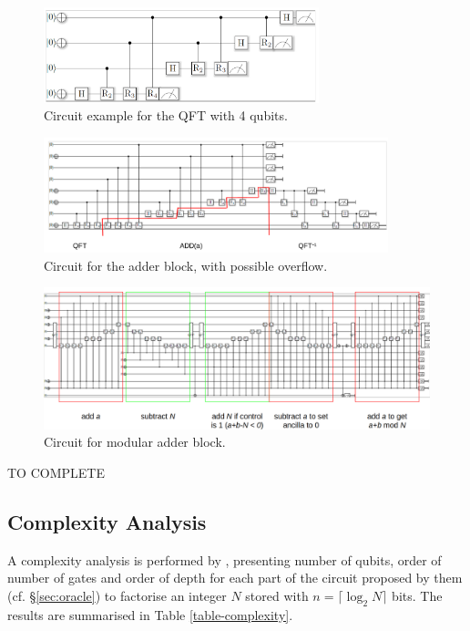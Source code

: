 \documentclass[a4paper, 10pt]{article}
\numberwithin{equation}{section}
\numberwithin{figure}{section}
\numberwithin{table}{section}
\begin{document}
\begin{figure}[h!]
	\centering
	\includegraphics[width=8cm]{Figures/generated-qft}
	\caption{Circuit example for the QFT with 4 qubits.}
	\label{fig:gen1}
\end{figure}

\begin{figure}[h!]
	\centering
	\includegraphics[width=10cm]{Figures/generated-adder}
	\caption{Circuit for the adder block, with possible overflow.}
	\label{fig:gen2}
\end{figure}

\begin{figure}[h!]
	\centering
	\includegraphics[width=12cm]{Figures/generated-modadder}
	\caption{Circuit for modular adder block.}
	\label{fig:gen3}
\end{figure}

{\color{red} TO COMPLETE}

\subsection{Complexity Analysis}
\label{sec:complexity}

A complexity analysis is performed by \cite{beauregard}, presenting number of qubits, order of number of gates and order of depth for each part of the circuit proposed by them (cf. \S \ref{sec:oracle}) to factorise an integer $N$ stored with $n=\lceil\log_2N\rceil$ bits. The results are summarised in Table \ref{table-complexity}.
\end{document}
